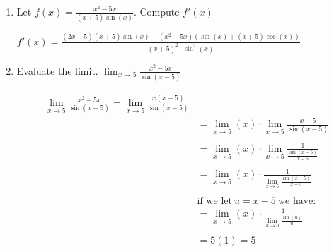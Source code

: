 \documentclass[nooutcomes]{ximera}
\begin{document}
\begin{problem} \hfil

\begin{enumerate}
	\item Let $f(x)= \frac{x^2-5x}{(x+5)\sin(x)}$.  Compute $f'(x)$

	\begin{freeResponse}	
	$f'(x)= \frac{(2x-5)(x+5)\sin(x)-(x^2-5x)(\sin(x)+(x+5)\cos(x))}{(x+5)^2 \cdot\sin^2(x)}$

	\end{freeResponse}

	\item Evaluate the limit. $\lim_{x \to 5} \frac{x^2-5x}{\sin(x-5)}$

	\begin{freeResponse}
	\begin{align*}
	\lim_{x \to 5} \frac{x^2-5x}{\sin(x-5)}=\lim_{x \to 5} \frac{x(x-5)}{\sin(x-5)}\\
	&=\lim_{x \to 5}(x) \cdot  \lim_{x \to 5}\frac{x-5}{\sin(x-5)}\\\\
	&=\lim_{x \to 5}(x) \cdot  \lim_{x \to 5}\frac{1}{\frac{\sin(x-5)}{x-5}}\\\\
	&=\lim_{x \to 5}(x) \cdot \frac{1}{ \lim_{x \to 5}\frac{\sin(x-5)}{x-5}}\\\\
	& \text{if we let}\ u=x-5\ \text{we have:}\\
	&=\lim_{x \to 5}(x) \cdot  \frac{1}{\lim_{u \to 0}\frac{\sin(u)}{u}}\\\\
	&= 5(1)=5
	\end{align*}
	\end{freeResponse}

\end{enumerate}
\end{problem}		
		
\end{document}

